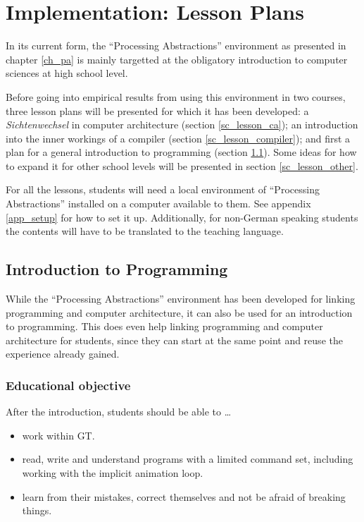 
\chapter{Implementation: Lesson Plans} \label{ch_teaching}

In its current form, the ``Processing Abstractions'' environment as presented in chapter \ref{ch_pa} is mainly targetted at the obligatory introduction to computer sciences at high school level.

Before going into empirical results from using this environment in two courses, three lesson plans will be presented for which it has been developed: a \emph{Sichtenwechsel} in computer architecture (section \ref{sc_lesson_ca}); an introduction into the inner workings of a compiler (section \ref{sc_lesson_compiler}); and first a plan for a general introduction to programming (section \ref{sc_lesson_intro}). Some ideas for how to expand it for other school levels will be presented in section \ref{sc_lesson_other}.

For all the lessons, students will need a local environment of ``Processing Abstractions'' installed on a computer available to them. See appendix \ref{app_setup} for how to set it up. Additionally, for non-German speaking students the contents will have to be translated to the teaching language.



\section{Introduction to Programming} \label{sc_lesson_intro}

While the ``Processing Abstractions'' environment has been developed for linking programming and computer architecture, it can also be used for an introduction to programming. This does even help linking programming and computer architecture for students, since they can start at the same point and reuse the experience already gained.


\subsection{Educational objective}

After the introduction, students should be able to \dots
\begin{itemize}
\item work within \ac{GT}.
\item read, write and understand programs with a limited command set, including working with the implicit animation loop.
\item learn from their mistakes, correct themselves and not be afraid of breaking things.
\end{itemize}


